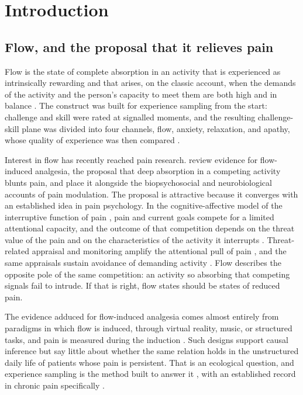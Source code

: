 \documentclass[11pt,a4paper]{article}
\begin{document}
\section{Introduction}

\subsection{Flow, and the proposal that it relieves pain}
Flow is the state of complete absorption in an activity that is experienced as intrinsically
rewarding and that arises, on the classic account, when the demands of the activity and the
person's capacity to meet them are both high and in balance
\citep{csikszentmihalyi1990flow,nakamura2014flow}. The construct was built for
experience sampling from the start: challenge and skill were rated at signalled moments, and the
resulting challenge-skill plane was divided into four channels, flow, anxiety, relaxation, and
apathy, whose quality of experience was then compared
\citep{massimini1988systematic,carli1988quality,csikszentmihalyi1987validity}.

Interest in flow has recently reached pain research. \citet{gromakovskis2025flow} review evidence
for flow-induced analgesia, the proposal that deep absorption in a competing activity blunts pain,
and place it alongside the biopsychosocial and neurobiological accounts of pain modulation. The
proposal is attractive because it converges with an established idea in pain psychology. In the
cognitive-affective model of the interruptive function of pain \citep{eccleston1999pain}, pain and
current goals compete for a limited attentional capacity, and the outcome of that competition
depends on the threat value of the pain and on the characteristics of the activity it interrupts
\citep{crombez1998catastrophizing,crombez1999fear,vandamme2010keeping}. Threat-related appraisal and
monitoring amplify the attentional pull of pain
\citep{crombez2013attention,eccleston2007worry}, and the same appraisals sustain avoidance of
demanding activity \citep{crombez2012fear}. Flow describes the opposite pole of the
same competition: an activity so absorbing that competing signals fail to intrude. If that is
right, flow states should be states of reduced pain.

The evidence adduced for flow-induced analgesia comes almost entirely from paradigms in which
flow is induced, through virtual reality, music, or structured tasks, and pain is measured during
the induction \citep{gromakovskis2025flow}. Such designs support causal inference but say little
about whether the same relation holds in the unstructured daily life of patients whose pain is
persistent. That is an ecological question, and experience sampling is the method built to answer it
\citep{myingermeys2018experience,shiffman2008ecological,stone1998strategies}, with an established
record in chronic pain specifically
\citep{tennen1996daily,affleck1999multilevel,peters2000electronic}.
\end{document}
